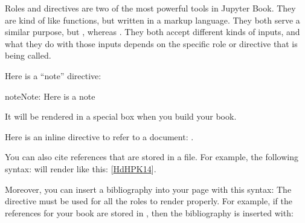 \documentclass[letterpaper,10pt,english]{jupyterBook}
\begin{document}
\sphinxAtStartPar
Roles and directives are two of the most powerful tools in Jupyter Book. They
are kind of like functions, but written in a markup language. They both
serve a similar purpose, but , whereas
. They both accept different kinds of inputs,
and what they do with those inputs depends on the specific role or directive
that is being called.

\sphinxAtStartPar
Here is a “note” directive:

\begin{sphinxadmonition}{note}{Note:}
\sphinxAtStartPar
Here is a note
\end{sphinxadmonition}

\sphinxAtStartPar
It will be rendered in a special box when you build your book.

\sphinxAtStartPar
Here is an inline directive to refer to a document: .

\begin{DUlineblock}{0em}
\item[] 
\end{DUlineblock}

\sphinxAtStartPar
You can also cite references that are stored in a  file. For example,
the following syntax:  will render like
this: {[}\hyperlink{cite.src/test/markdown:id3}{HdHPK14}{]}.

\sphinxAtStartPar
Moreover, you can insert a bibliography into your page with this syntax:
The  directive must be used for all the  roles to
render properly.
For example, if the references for your book are stored in ,
then the bibliography is inserted with:

\begin{DUlineblock}{0em}
\item[] 
\end{DUlineblock}
\end{document}
